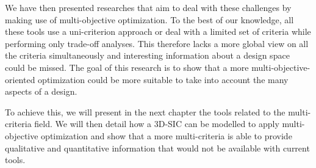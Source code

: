 We have then presented researches that aim to deal with these challenges by making use of multi-objective optimization. To the best of our knowledge, all these tools use a uni-criterion approach or deal with a limited set of criteria while performing only trade-off analyses. This therefore lacks a more global view on all the criteria simultaneously and interesting information about a design space could be missed. The goal of this research is to show that a more multi-objective-oriented optimization could be more suitable to take into account the many aspects of a design.

To achieve this, we will present in the next chapter the tools related to the multi-criteria field. We will then detail how a 3D-SIC can be modelled to apply multi-objective optimization and show that a more multi-criteria is able to provide qualitative and quantitative information that would not be available with current tools.

